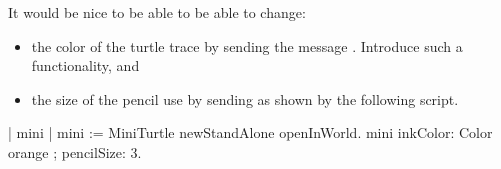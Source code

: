 It would be nice to be able to be able to change: 
\begin{itemize}

\item the color of the turtle trace by
sending the message . Introduce such a functionality, and 

\item the size of the pencil use by sending  as shown by the following script.
\end{itemize}

\begin{scriptwithouttitle}
| mini |
mini := MiniTurtle newStandAlone openInWorld.
mini inkColor: Color orange ; pencilSize: 3.
\end{scriptwithouttitle}


\ifx\wholebook\relax\else

\fi



